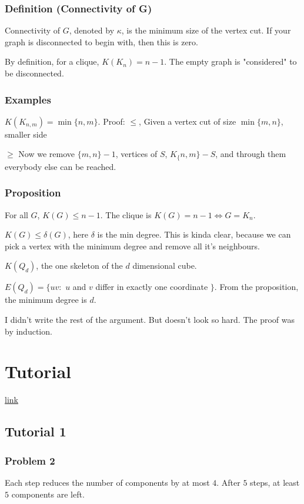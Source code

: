\documentclass[11pt]{article}
\def\min{\operatorname{min}}
\begin{document}
\subsubsection{Definition (Connectivity of G)}
\label{sec:orgeecd26f}
Connectivity of \(G\), denoted by \(\kappa\), is the minimum size of the vertex
cut. If your graph is disconnected to begin with, then this is zero.

By definition, for a clique, \(K(K_n) = n-1\). The empty graph is "considered"
to be disconnected.
\subsubsection{Examples}
\label{sec:orgfff5a9f}
\(K(K_{n, m})= \min\{n, m\}\). Proof: \(\le\), Given a vertex cut of size
\(\min\{m, n\}\), smaller side

\(\ge\) Now we remove \(\{m, n\} - 1\), vertices of \(S\), \(K_\{n, m\} - S\), and
through them everybody else can be reached.
\subsubsection{Proposition}
\label{sec:org1464efa}
For all \(G\), \(K(G) \le n-1\). The clique is \(K(G) = n-1 \iff G = K_n\).

\(K(G) \le \delta(G)\), here \(\delta\) is the min degree. This is kinda clear,
because we can pick a vertex with the minimum degree and remove all it's
neighbours.

\(K(Q_d)\), the one skeleton of the \(d\) dimensional cube.

\(E(Q_d) = \{uv \colon\) \(u\) and \(v\) differ in exactly one coordinate \(\}\).
From the proposition, the minimum degree is \(d\).

I didn't write the rest of the argument. But doesn't look so hard. The proof
was by induction.
\section{Tutorial}
\label{sec:orgd4fa918}
\href{http://discretemath.imp.fu-berlin.de/DMII-2018-19/}{link}
\subsection{Tutorial 1}
\label{sec:orgd6ce0af}
\subsubsection{Problem 2}
\label{sec:org357c53f}
Each step reduces the number of components by at most \(4\). After \(5\) steps, at least \(5\) components are left. 
\end{document}
